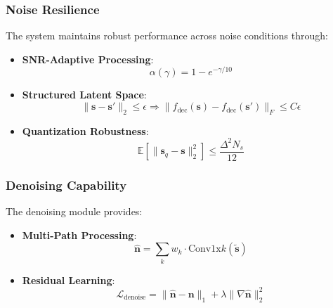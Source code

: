 \documentclass[lettersize,journal]{IEEEtran}
\begin{document}
\subsubsection{Noise Resilience} 
\label{subsubsec:noise_resilience}

The system maintains robust performance across noise conditions through:

\begin{itemize}
    \item \textbf{SNR-Adaptive Processing}:
    \begin{equation}
        \alpha(\gamma) = 1 - e^{-\gamma/10}
    \end{equation}
    \item \textbf{Structured Latent Space}:
    \begin{equation}
        \|\mathbf{s} - \mathbf{s}'\|_2 \leq \epsilon \Rightarrow \|f_{\text{dec}}(\mathbf{s}) - f_{\text{dec}}(\mathbf{s}')\|_F \leq C\epsilon
    \end{equation}

    \item \textbf{Quantization Robustness}:
    \begin{equation}
        \mathbb{E}[\|\mathbf{s}_q - \mathbf{s}\|_2^2] \leq \frac{\Delta^2 N_s}{12}
    \end{equation}
\end{itemize}

\subsubsection{Denoising Capability} 
\label{subsubsec:denoising}

The denoising module provides:

\begin{itemize}
    \item \textbf{Multi-Path Processing}:
    \begin{equation}
        \hat{\mathbf{n}} = \sum_{k} w_k \cdot \text{Conv1x}k(\tilde{\mathbf{s}})
    \end{equation}

    \item \textbf{Residual Learning}:
    \begin{equation}
        \mathcal{L}_{\text{denoise}} = \|\hat{\mathbf{n}} - \mathbf{n}\|_1 + \lambda\|\nabla\hat{\mathbf{n}}\|_2^2
    \end{equation}
\end{itemize}
\end{document}
